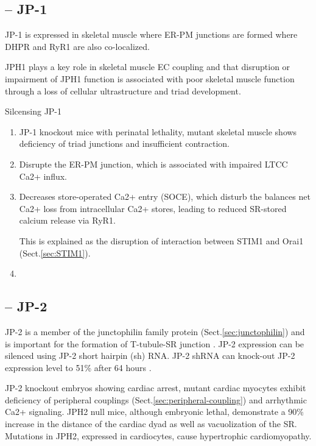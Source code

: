 \subsection{-- JP-1}
\label{sec:JP-1}

JP-1 is expressed in skeletal muscle where ER-PM junctions are formed where
DHPR and RyR1 are also co-localized.


JPH1 plays a key role in skeletal muscle EC coupling and that disruption or
impairment of JPH1 function is associated with poor skeletal muscle function
through a loss of cellular ultrastructure and triad development.

Silcensing JP-1
\begin{enumerate}
  
  \item JP-1 knockout mice with perinatal lethality, mutant skeletal muscle
  shows deficiency of triad junctions and insufficient contraction.

  \item Disrupte the ER-PM junction, which is associated with impaired LTCC Ca2+ influx.

  \item Decreases store-operated Ca2+ entry (SOCE), which disturb the balances
  net Ca2+ loss from intracellular Ca2+ stores, leading to reduced
  SR-stored calcium release via RyR1.
  
  This is explained as the disruption of interaction between STIM1 and Orai1
  (Sect.\ref{sec:STIM1}).
  

  \item 
\end{enumerate}



\subsection{-- JP-2}
\label{sec:JP-2}

JP-2 is a member of the junctophilin family protein
(Sect.\ref{sec:junctophilin}) and is important for the formation of T-tubule-SR
junction \citep{21}. JP-2 expression can be silenced using JP-2 short hairpin
(sh) RNA. JP-2 shRNA can knock-out JP-2 expression level to 51\% after 64 hours
\citep{wei2010}.

JP-2 knockout embryos showing cardiac arrest, mutant cardiac myocytes exhibit
deficiency of peripheral couplings (Sect.\ref{sec:peripheral-coupling}) and
arrhythmic Ca2+ signaling. JPH2 null mice, although embryonic lethal,
demonstrate a 90\% increase in the distance of the cardiac dyad as well as
vacuolization of the SR. Mutations in JPH2, expressed in cardiocytes, cause
hypertrophic cardiomyopathy.

